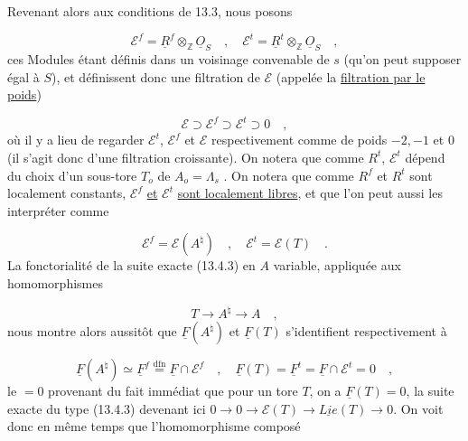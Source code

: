 
Revenant alors aux conditions de 13.3, nous posons

\begin{equation}\tag{13.4.7}
\mathcal{E}^f = \underline{R}^f \otimes_{\mathbb{Z}} \underline{O}_S \quad , \quad \mathcal{E}^t = \underline{R}^t \otimes_{\mathbb{Z}} \underline{O}_S \quad ,
\end{equation}
ces Modules étant définis dans un voisinage convenable de $s$ (qu'on peut supposer égal à $S$), et définissent donc une filtration de $\mathcal{E}$ (appelée la \underline{filtration par le poids})

\begin{equation}\tag{13.4.8}
\mathcal{E} \supset \mathcal{E}^f \supset \mathcal{E}^t \supset 0 \quad ,
\end{equation}
où il y a lieu de regarder $\mathcal{E}^t$, $\mathcal{E}^f$ et $\mathcal{E}$ respectivement comme de poids $-2,-1$ et $0$ (il s'agit donc d'une filtration croissante). On notera que comme $R^t$, $\mathcal{E}^t$ dépend du choix d'un sous-tore $T_o$ de $A_o = \Lambda_s$ . On notera que comme $R^f$ et $R^t$ sont localement constants, $\mathcal{E}^f$ \underline{et} $\mathcal{E}^t$ \underline{sont localement libres}, et que l'on peut aussi les interpréter comme

\begin{equation}\tag{13.4.9}
\mathcal{E}^f = \mathcal{E}(A^\natural) \quad , \quad \mathcal{E}^t = \mathcal{E}(T) \quad .
\end{equation}
La fonctorialité de la suite exacte (13.4.3) en $A$ variable, appliquée aux homomorphismes

\begin{equation*}
T \longrightarrow A^\natural \longrightarrow A \quad ,
\end{equation*}
nous montre alors aussitôt que $\underline{F}(A^\natural)$ et $\underline{F}(T)$ s'identifient respectivement à

\begin{equation}\tag{13.4.10}
\underline{F}(A^\natural) \simeq \underline{F}^f \stackrel{\mathrm{dfn}}{=} \underline{F} \cap \mathcal{E}^f \quad , \quad \underline{F}(T) = \underline{F}^t = \underline{F} \cap \mathcal{E}^t = 0 \quad ,
\end{equation}
le $=0$ provenant du fait immédiat que pour un tore $T$, on a $\underline{F}(T) = 0$, la suite exacte du type (13.4.3) devenant ici $0 \to 0 \to \mathcal{E}(T) \to \underline{Lie}(T) \to 0$. On voit donc en même temps que l'homomorphisme composé

